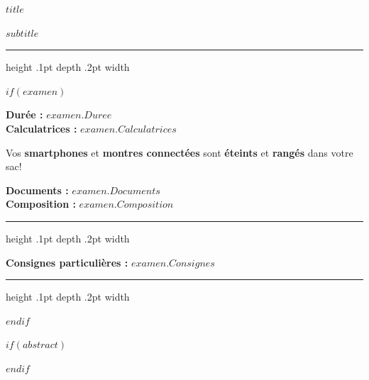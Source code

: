 \begin{center}
\bigskip
\textbf{\sffamily\Large $title$} 

\vspace{1pt}

\textbf{\sffamily\large $subtitle$}
\medskip
\end{center}
\medskip
\hrule height .1pt depth .2pt width \textwidth
\medskip

$if(examen)$

\begin{minipage}[t]{.5\textwidth}
\flushleft
\textbf{\textcolor{gsi_violet}{Durée :}} $examen.Duree$ \\[2pt]
\textbf{\textcolor{gsi_violet}{Calculatrices :}} $examen.Calculatrices$ \\[2pt] 
\end{minipage}
\hfill
\begin{minipage}[t]{.49\textwidth}
\flushright
Vos \textbf{smartphones} et \textbf{montres connectées} sont \textbf{éteints} et \textbf{rangés} dans votre sac!
\end{minipage}

\textbf{\textcolor{gsi_violet}{Documents :}} $examen.Documents$ \\[2pt] 
\textbf{\textcolor{gsi_violet}{Composition :}} $examen.Composition$ \\[2pt] 


\hrule height .1pt depth .2pt width \textwidth

\medskip
\textbf{\textcolor{gsi_violet}{Consignes particulières :}} $examen.Consignes$ 
\bigskip

\hrule height .1pt depth .2pt width \textwidth

\bigskip

$endif$


$if(abstract)$
\begin{abstract}
$abstract$
\end{abstract}
$endif$

